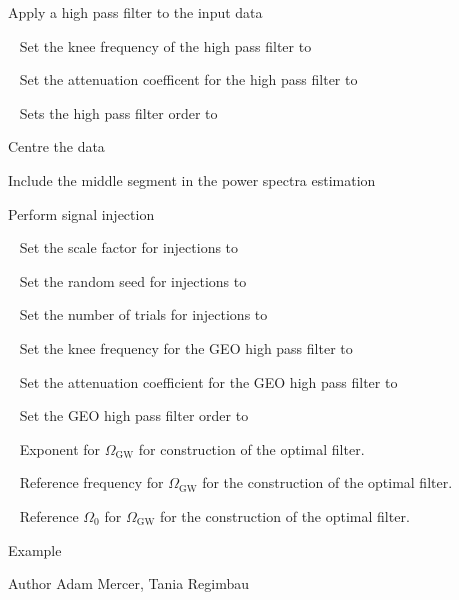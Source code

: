 \begin{entry}
\begin{entry}
\item[\option{--high-pass-filter}]
Apply a high pass filter to the input data

\item[\option{--hpf-frequency}~\parm{N}]
Set the knee frequency of the high pass filter to 

\item[\option{--hpf-attenuation}~\parm{N}]
Set the attenuation coefficent for the high pass filter to 

\item[\option{--hpf-order}~\parm{N}]
Sets the high pass filter order to 

\item[\option{--recentre}]
Centre the data

\item[\option{--middle-segment}]
Include the middle segment in the power spectra estimation

\item[\option{--inject}]
Perform signal injection

\item[\option{--scale-factor}~\parm{N}]
Set the scale factor for injections to 

\item[\option{--seed}~\parm{N}]
Set the random seed for injections to 

\item[\option{--trials}~\parm{N}]
Set the number of trials for injections to 

\item[\option{--geo-hpf-frequency}~\parm{N}]
Set the knee frequency for the GEO high pass filter to 

\item[\option{--geo-hpf-attenuation}~\parm{N}]
Set the attenuation coefficient for the GEO high pass filter to 

\item[\option{--geo-hpf-order}~\parm{N}]
Set the GEO high pass filter order to 

\item[\option{--alpha}~\parm{N}]
Exponent for $\Omega_{\mathrm{GW}}$ for construction of the optimal
filter.

\item[\option{--f-ref}~\parm{N}]
Reference frequency for $\Omega_{\mathrm{GW}}$ for the construction of
the optimal filter.

\item[\option{--omega0}~\parm{N}]
Reference $\Omega_0$ for $\Omega_{\mathrm{GW}}$ for the construction of
the optimal filter.
\end{entry}

\item[Example]

\item[Author] 
Adam Mercer, Tania Regimbau
\end{entry}
\clearpage

